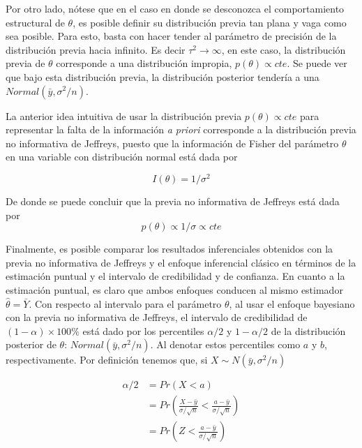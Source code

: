 \documentclass[
  10pt,
  spanish,
]{book}
\theoremstyle{definition}
\theoremstyle{definition}
\theoremstyle{definition}
\theoremstyle{definition}
\theoremstyle{remark}
\begin{document}
Por otro lado, nótese que en el caso en donde se desconozca el comportamiento estructural de \(\theta\), es posible definir su distribución previa tan plana y vaga como sea posible. Para esto, basta con hacer tender al parámetro de precisión de la distribución previa hacia infinito. Es decir \(\tau^2 \longrightarrow \infty\), en este caso, la distribución previa de \(\theta\) corresponde a una distribución impropia, \(p(\theta)\propto cte\). Se puede ver que bajo esta distribución previa, la distribución posterior tendería a una \(Normal(\bar{y},\sigma^2/n)\).

La anterior idea intuitiva de usar la distribución previa \(p(\theta)\propto cte\) para representar la falta de la información \emph{a priori} corresponde a la distribución previa no informativa de Jeffreys, puesto que la información de Fisher del parámetro \(\theta\) en una variable con distribución normal está dada por

\begin{equation*}
I(\theta)=1/\sigma^2
\end{equation*}

De donde se puede concluir que la previa no informativa de Jeffreys está dada por
\begin{equation*}
p(\theta)\propto 1/\sigma\propto cte
\end{equation*}

Finalmente, es posible comparar los resultados inferenciales obtenidos con la previa no informativa de Jeffreys y el enfoque inferencial clásico en términos de la estimación puntual y el intervalo de credibilidad y de confianza. En cuanto a la estimación puntual, es claro que ambos enfoques conducen al mismo estimador \(\hat{\theta}=\bar{Y}\). Con respecto al intervalo para el parámetro \(\theta\), al usar el enfoque bayesiano con la previa no informativa de Jeffreys, el intervalo de credibilidad de \((1-\alpha)\times 100\%\) está dado por los percentiles \(\alpha/2\) y \(1-\alpha/2\) de la distribución posterior de \(\theta\): \(Normal(\bar{y},\sigma^2/n)\). Al denotar estos percentiles como \(a\) y \(b\), respectivamente.
Por definición tenemos que, si \(X\sim N(\bar{y},\sigma^2/n)\)

\begin{align*}
\alpha/2&=Pr(X<a)\\
&=Pr(\frac{X-\bar{y}}{\sigma/\sqrt{n}}<\frac{a-\bar{y}}{\sigma/\sqrt{n}})\\
&=Pr(Z < \frac{a-\bar{y}}{\sigma/\sqrt{n}})
\end{align*}
\end{document}
